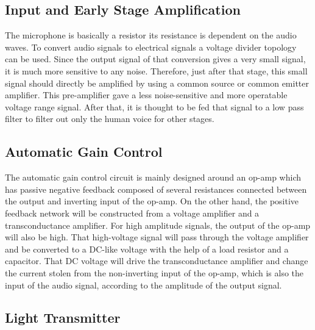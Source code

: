 \documentclass[a4paper,10pt]{IEEEtran}
\begin{document}
\subsection{Input and Early Stage Amplification}
The microphone is basically a resistor its resistance is dependent on the audio waves. To convert audio signals to electrical signals a voltage divider topology can be used. Since the output signal of that conversion gives a very small signal, it is much more sensitive to any noise. Therefore, just after that stage, this small signal should directly be amplified by using a common source or common emitter amplifier. This pre-amplifier gave a less noise-sensitive and more operatable voltage range signal. After that, it is thought to be fed that signal to a low pass filter to filter out only the human voice for other stages. 
\vspace{-0.5cm}
\subsection{Automatic Gain Control}

The automatic gain control circuit is mainly designed around an op-amp which has passive negative feedback composed of several resistances connected between the output and inverting input of the op-amp. On the other hand, the positive feedback network will be constructed from a voltage amplifier and a transconductance amplifier. For high amplitude signals, the output of the op-amp will also be high. That high-voltage signal will pass through the voltage amplifier and be converted to a DC-like voltage with the help of a load resistor and a capacitor. That DC voltage will drive the transconductance amplifier and change the current stolen from the non-inverting input of the op-amp, which is also the input of the audio signal, according to the amplitude of the output signal. 
\vspace{-0.3cm}

\subsection{Light Transmitter}
\end{document}

